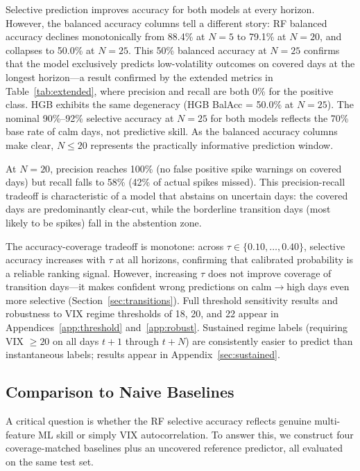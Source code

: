 \documentclass[11pt]{article}
\begin{document}
Selective prediction improves accuracy for both models at every horizon. However, the balanced accuracy columns tell a different story: RF balanced accuracy declines monotonically from 88.4\% at $N = 5$ to 79.1\% at $N = 20$, and collapses to 50.0\% at $N = 25$. This 50\% balanced accuracy at $N = 25$ confirms that the model exclusively predicts low-volatility outcomes on covered days at the longest horizon---a result confirmed by the extended metrics in Table~\ref{tab:extended}, where precision and recall are both 0\% for the positive class. HGB exhibits the same degeneracy (HGB BalAcc = 50.0\% at $N = 25$). The nominal 90\%--92\% selective accuracy at $N = 25$ for both models reflects the 70\% base rate of calm days, not predictive skill. As the balanced accuracy columns make clear, $N \leq 20$ represents the practically informative prediction window.

At $N = 20$, precision reaches 100\% (no false positive spike warnings on covered days) but recall falls to 58\% (42\% of actual spikes missed). This precision-recall tradeoff is characteristic of a model that abstains on uncertain days: the covered days are predominantly clear-cut, while the borderline transition days (most likely to be spikes) fall in the abstention zone.

The accuracy-coverage tradeoff is monotone: across $\tau \in \{0.10, \ldots, 0.40\}$, selective accuracy increases with $\tau$ at all horizons, confirming that calibrated probability is a reliable ranking signal. However, increasing $\tau$ does not improve coverage of transition days---it makes confident wrong predictions on calm$\to$high days even more selective (Section~\ref{sec:transitions}). Full threshold sensitivity results and robustness to VIX regime thresholds of 18, 20, and 22 appear in Appendices~\ref{app:threshold} and~\ref{app:robust}. Sustained regime labels (requiring VIX $\geq 20$ on all days $t+1$ through $t+N$) are consistently easier to predict than instantaneous labels; results appear in Appendix~\ref{sec:sustained}.

\subsection{Comparison to Naive Baselines}
\label{sec:baselines}

A critical question is whether the RF selective accuracy reflects genuine multi-feature ML skill or simply VIX autocorrelation. To answer this, we construct four coverage-matched baselines plus an uncovered reference predictor, all evaluated on the same test set.
\end{document}
